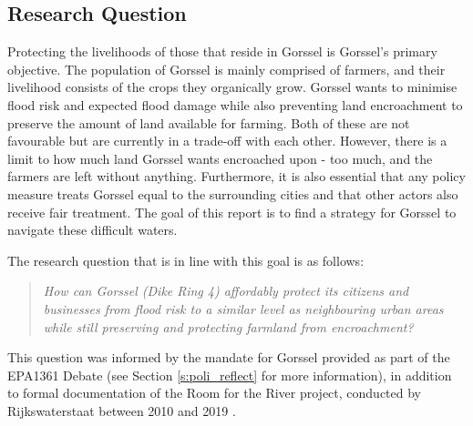 


\subsection{Research Question}

Protecting the livelihoods of those that reside in Gorssel is Gorssel's primary objective. The population of Gorssel is mainly comprised of farmers, and their livelihood consists of the crops they organically grow. Gorssel wants to minimise flood risk and expected flood damage while also preventing land encroachment to preserve the amount of land available for farming. Both of these are not favourable but are currently in a trade-off with each other. However, there is a limit to how much land Gorssel wants encroached upon - too much, and the farmers are left without anything. Furthermore, it is also essential that any policy measure treats Gorssel equal to the surrounding cities and that other actors also receive fair treatment. The goal of this report is to find a strategy for Gorssel to navigate these difficult waters. %


The research question that is in line with this goal is as follows: 
\begin{quote}
    \textit{How can Gorssel (Dike Ring 4) affordably protect its citizens and businesses from flood risk to a similar level as neighbouring urban areas while still preserving and protecting farmland from encroachment?}
\end{quote}

\noindent This question was informed by the mandate for Gorssel provided as part of the EPA1361 Debate (see Section \ref{s:poli_reflect} for more information), in addition to formal documentation of the Room for the River project, conducted by Rijkswaterstaat between 2010 and 2019 \parencite{rijkswaterstaat_tailor_2013,rijke_room_2012}.

